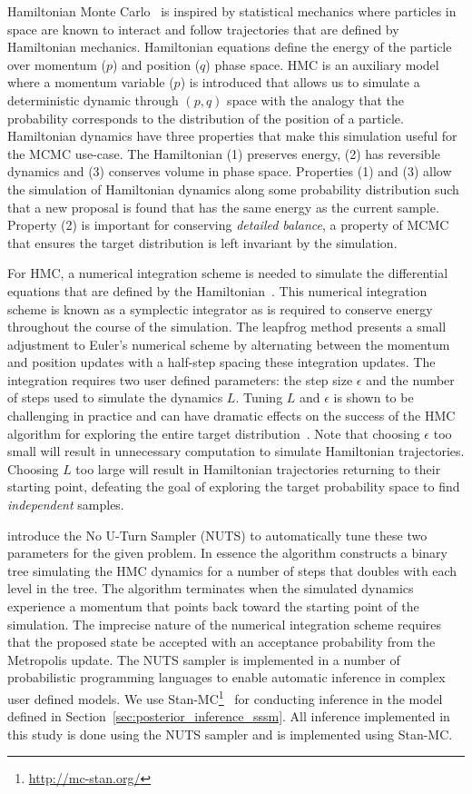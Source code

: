 Hamiltonian Monte Carlo~\citep{neal2011mcmc} is inspired by statistical mechanics where particles in space are known to interact and follow trajectories that are defined by Hamiltonian mechanics. Hamiltonian equations define the energy of the particle over momentum ($p$) and position ($q$) phase space. HMC is an auxiliary model where a momentum variable ($p$) is introduced that allows us to simulate a deterministic dynamic through $(p,q)$ space with the analogy that the probability corresponds to the distribution of the position of a particle. Hamiltonian dynamics have three properties that make this simulation useful for the MCMC use-case. The Hamiltonian (1) preserves energy, (2) has reversible dynamics and (3) conserves volume in phase space. Properties (1) and (3) allow the simulation of Hamiltonian dynamics along some probability distribution such that a new proposal is found that has the same energy as the current sample. Property (2) is important for conserving \textit{detailed balance}, a property of MCMC that ensures the target distribution is left invariant by the simulation.

For HMC, a numerical integration scheme is needed to simulate the differential equations that are defined by the Hamiltonian~\citep{neal2011mcmc}. This numerical integration scheme is known as a symplectic integrator as is required to conserve energy throughout the course of the simulation. The leapfrog method presents a small adjustment to Euler's numerical scheme by alternating between the momentum and position updates with a half-step spacing these integration updates. The integration requires two user defined parameters: the step size $\epsilon$ and the number of steps used to simulate the dynamics $L$. Tuning $L$ and $\epsilon$ is shown to be challenging in practice and can have dramatic effects on the success of the HMC algorithm for exploring the entire target distribution~\citep{hoffman2014no}. Note that choosing $\epsilon$ too small will result in unnecessary computation to simulate Hamiltonian trajectories. Choosing $L$ too large will result in Hamiltonian trajectories returning to their starting point, defeating the goal of exploring the target probability space to find \textit{independent} samples.

\cite{hoffman2014no} introduce the No U-Turn Sampler (NUTS) to automatically tune these two parameters for the given problem. In essence the algorithm constructs a binary tree simulating the HMC dynamics for a number of steps that doubles with each level in the tree. The algorithm terminates when the simulated dynamics experience a momentum that points back toward the starting point of the simulation. The imprecise nature of the numerical integration scheme requires that the proposed state be accepted with an acceptance probability from the Metropolis update. The NUTS sampler is implemented in a number of probabilistic programming languages to enable automatic inference in complex user defined models. We use Stan-MC\footnote{\url{http://mc-stan.org/}}~\citep{carpenter2016stan} for conducting inference in the model defined in Section~\ref{sec:posterior_inference_sssm}. All inference implemented in this study is done using the NUTS sampler and is implemented using Stan-MC.

